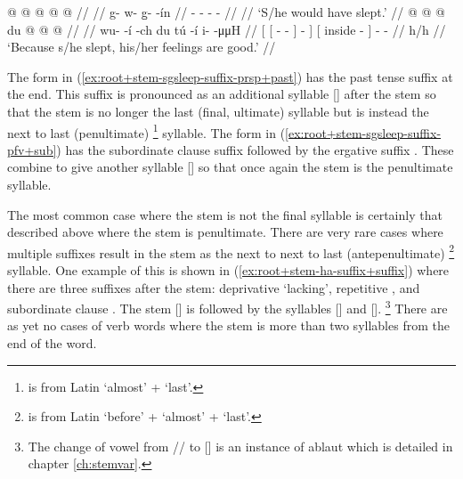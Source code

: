 \pex\label{exx:root+stem-sgsleep-suffix}%
\a\label{ex:root+stem-sgsleep-suffix-prsp+past}%
%
\begingl
	\gla	{} @ {} @ {} @ {} @ {} @ {} //
	\glp	\llap{[}\rlap{\ipa{kʷùː.qà.ˈ\gm{tʰàː}.jín}]} {} {} {} {} {} //
	\glb	g- w- g̱-   -ín //
	\glc	{}- - -   - //
	\gld	{} {} {} {} {} {} //
	\glft	‘S/he would have slept.’
		//
\endgl
\a\label{ex:root+stem-sgsleep-suffix-pfv+sub}%
%
\begingl
	\gla	{} {}  @ {} @ {} @ {} {} {} {}
		{} du  @ {} {}  @ {} @ {} //
	\glp	{} {} \llap{[} {} {} {} {} {} {}
		{}   {} {} \rlap{\ipa{jà.ˈkʼéː}]} {} {} //
	\glb	{} {} wu-   -í {} -ch {}
		{} du tú -í {} i-  -μμH //
	\glc	{}[ {}[ -   - {}] - {}]
		{}[  inside - {}] -  - //
	\gld	{} {}  {} {} {} {} {} {}
		{} h/h  {} {}  {} {} //
	\glft	‘Because s/he slept, his/her feelings are good.’
		//
\endgl
\xe

The form in (\ref{ex:root+stem-sgsleep-suffix-prsp+past}) has the past tense suffix  at the end.
This suffix is pronounced as an additional syllable [] after the stem so that the stem is no longer the last (final, ultimate) syllable but is instead the next to last (penultimate)%
\footnote{ is from Latin  ‘almost’ +  ‘last’.} syllable.
The form in (\ref{ex:root+stem-sgsleep-suffix-pfv+sub}) has the subordinate clause suffix  followed by the ergative suffix .
These combine to give another syllable [] so that once again the stem is the penultimate syllable.

The most common case where the stem is not the final syllable is certainly that described above where the stem is penultimate.
There are very rare cases where multiple suffixes result in the stem as the next to next to last (antepenultimate)%
\footnote{ is from Latin  ‘before’ +  ‘almost’ +  ‘last’.} syllable.
One example of this is shown in (\ref{ex:root+stem-ha-suffix+suffix}) where there are three suffixes after the stem: deprivative  ‘lacking’, repetitive , and subordinate clause .
The stem [] is followed by the syllables [] and [].%
\footnote{The change of vowel from // to [] is an instance of ablaut which is detailed in chapter \ref{ch:stemvar}.}
There are as yet no cases of verb words where the stem is more than two syllables from the end of the word.


